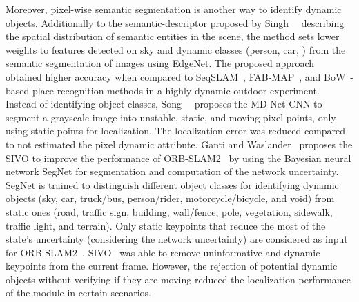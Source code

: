 Moreover, pixel-wise semantic segmentation is another way to identify dynamic objects.
Additionally to the semantic-descriptor proposed by Singh~\etal~\cite{singh-et-al:2021:9564866} describing the spatial distribution of semantic entities in the scene, the method sets lower weights to features detected on sky and dynamic classes (person, car, \etc) from the semantic segmentation of images using EdgeNet. The proposed approach \cite{singh-et-al:2021:9564866} obtained higher accuracy when compared to SeqSLAM~\cite{discussion:seqslam}, FAB-MAP~\cite{discussion:fab-map}, and \gls{BoW}~\cite{discussion:bow}-based place recognition methods in a highly dynamic outdoor experiment.
Instead of identifying object classes, Song~\etal~\cite{song-et-al:2019:8967749} proposes the MD-Net \gls{CNN} to segment a grayscale image into unstable, static, and moving pixel points, only using static points for localization. The localization error was reduced compared to not estimated the pixel dynamic attribute.
Ganti and Waslander~\cite{ganti-waslander:2019:00024} proposes the \gls{SIVO} to improve the performance of ORB-SLAM2~\cite{discussion:orb-slam2} by using the Bayesian neural network SegNet for segmentation and computation of the network uncertainty. SegNet is trained to distinguish different object classes for identifying dynamic objects (sky, car, truck/bus, person/rider, motorcycle/bicycle, and void) from static ones (road, traffic sign, building, wall/fence, pole, vegetation, sidewalk, traffic light, and terrain). Only static keypoints that reduce the most of the state's uncertainty (considering the network uncertainty) are considered as input for ORB-SLAM2~\cite{discussion:orb-slam2}.
\gls{SIVO}~\cite{ganti-waslander:2019:00024} was able to remove uninformative and dynamic keypoints from the current frame. However, the rejection of potential dynamic objects without verifying if they are moving reduced the localization performance of the module in certain scenarios.

